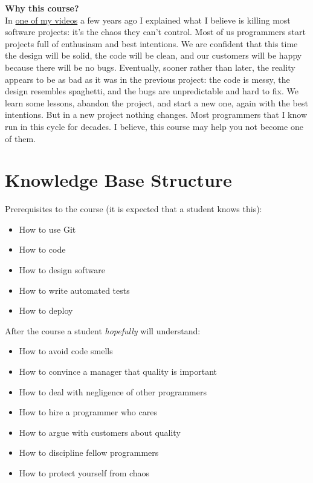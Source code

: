 \documentclass[nobrand,anonymous,nodate,nosecurity]{huawei}
\begin{document}
{\textbf{Why this course?}\\
In \href{https://www.youtube.com/watch?v=kPmbRkSWYnY}{one of my videos}
a few years ago I explained what I believe is killing
most software projects: it's the chaos they can't control. Most of us
programmers start projects full of enthusiasm and best intentions.
We are confident that this time the design will be solid, the code will
be clean, and our customers will be happy because there will be no bugs.
Eventually, sooner rather than later, the reality appears to be as bad
as it was in the previous project: the code is messy, the design resembles
spaghetti, and the bugs are unpredictable and hard to fix. We learn some
lessons, abandon the project, and start a new one, again with the best
intentions. But in a new project nothing changes.
Most programmers that I know run in this cycle for decades.
I believe, this course may help you not become one of them.

\newpage
\section*{Knowledge Base Structure}

Prerequisites to the course (it is expected that a student knows this):

\begin{itemize}
\item How to use Git
\item How to code
\item How to design software
\item How to write automated tests
\item How to deploy
\end{itemize}

After the course a student \emph{hopefully} will understand:

\begin{itemize}
\item How to avoid code smells
\item How to convince a manager that quality is important
\item How to deal with negligence of other programmers
\item How to hire a programmer who cares
\item How to argue with customers about quality
\item How to discipline fellow programmers
\item How to protect yourself from chaos
\end{itemize}

}
\end{document}
